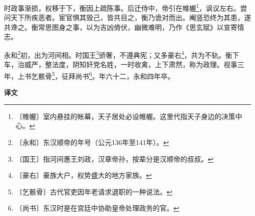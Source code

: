 \documentclass[12pt,UTF-8,openany,a4]{ctexbook}
\begin{document}
\begin{large}
    时政事渐损，权移于下，衡因上疏陈事。后迁侍中，帝引在帷幄\footnote{〔帷幄〕\yiwen 室内悬挂的帐幕，天子居处必设帷幄。这里代指天子身边的决策中心。}，讽议左右。尝问天下所疾恶者。宦官惧其毁己，皆共目之，衡乃诡对而出。阉竖恐终为其患，遂共谗之。衡常思图身之事，以为吉凶倚伏，幽微难明，乃作《思玄赋》以宣寄情志。
    
    永和\footnote{〔永和〕\yiwen 东汉顺帝的年号（公元136年至141年）。}初，出为河间相。时国王\footnote{〔国王〕\yiwen 指河间惠王刘政，汉章帝孙，按辈分是汉顺帝的叔叔。}骄奢，不遵典宪；又多豪右\footnote{〔豪右〕\yiwen 豪族大户，权势盛大的地方家族。}，共为不轨。衡下车，治威严，整法度，阴知奸党名姓，一时收禽，上下肃然，称为政理。视事三年，上书乞骸骨\footnote{〔乞骸骨〕\yiwen 古代官吏因年老请求退职的一种说法。}，征拜尚书\footnote{〔尚书〕\yiwen 东汉时是在宫廷中协助皇帝处理政务的官。}。年六十二，永和四年卒。
\end{large}


\newpage

\begin{Large}
    \noindent\textbf{译文}
\end{Large}


\vspace{1em}
\end{document}

